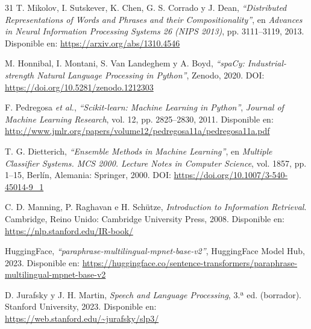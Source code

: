 \begin{thebibliography}{31}
T. Mikolov, I. Sutskever, K. Chen, G. S. Corrado y J. Dean, \textit{``Distributed Representations of Words and Phrases and their Compositionality''}, en \textit{Advances in Neural Information Processing Systems 26 (NIPS 2013)}, pp. 3111--3119, 2013. Disponible en: \url{https://arxiv.org/abs/1310.4546}
 
M. Honnibal, I. Montani, S. Van Landeghem y A. Boyd, \textit{``spaCy: Industrial-strength Natural Language Processing in Python''}, Zenodo, 2020. DOI: \url{https://doi.org/10.5281/zenodo.1212303}
 
F. Pedregosa \textit{et al.}, \textit{``Scikit-learn: Machine Learning in Python''}, \textit{Journal of Machine Learning Research}, vol. 12, pp. 2825--2830, 2011. Disponible en: \url{http://www.jmlr.org/papers/volume12/pedregosa11a/pedregosa11a.pdf}

T. G. Dietterich, \textit{``Ensemble Methods in Machine Learning''}, en
\textit{Multiple Classifier Systems. MCS 2000. Lecture Notes in Computer Science},
vol. 1857, pp. 1--15, Berlín, Alemania: Springer, 2000.
DOI: \url{https://doi.org/10.1007/3-540-45014-9_1}

C. D. Manning, P. Raghavan e H. Schütze, \textit{Introduction to Information
Retrieval}. Cambridge, Reino Unido: Cambridge University Press, 2008.
Disponible en: \url{https://nlp.stanford.edu/IR-book/}

HuggingFace, \textit{``paraphrase-multilingual-mpnet-base-v2''},
HuggingFace Model Hub, 2023. Disponible en:
\url{https://huggingface.co/sentence-transformers/paraphrase-multilingual-mpnet-base-v2}

D. Jurafsky y J. H. Martin, \textit{Speech and Language Processing}, 3.ª ed.
(borrador). Stanford University, 2023. Disponible en:
\url{https://web.stanford.edu/~jurafsky/slp3/}

\end{thebibliography}
